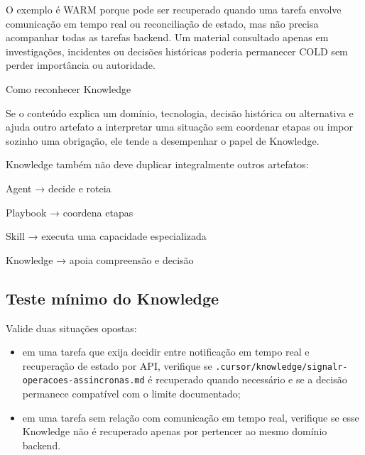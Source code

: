 \documentclass[
  10pt,
  a4paper,
  oneside]{book}
\newenvironment{Shaded}{}{}
\newcommand{\NormalTok}[1]{#1}
\providecommand{\tightlist}{%
  \setlength{\itemsep}{0pt}\setlength{\parskip}{0pt}}
\renewenvironment{Shaded}{\begin{snugshade}}{\end{snugshade}}%
\begin{document}
O exemplo é WARM porque pode ser recuperado quando uma tarefa envolve
comunicação em tempo real ou reconciliação de estado, mas não precisa
acompanhar todas as tarefas backend. Um material consultado apenas em
investigações, incidentes ou decisões históricas poderia permanecer COLD
sem perder importância ou autoridade.

\begin{examplebox}{Como reconhecer Knowledge}

Se o conteúdo explica um domínio, tecnologia, decisão histórica ou
alternativa e ajuda outro artefato a interpretar uma situação sem
coordenar etapas ou impor sozinho uma obrigação, ele tende a desempenhar
o papel de Knowledge.

\end{examplebox}

Knowledge também não deve duplicar integralmente outros artefatos:

\begin{Shaded}
\begin{Highlighting}[]
\NormalTok{Agent}
\NormalTok{→ decide e roteia}

\NormalTok{Playbook}
\NormalTok{→ coordena etapas}

\NormalTok{Skill}
\NormalTok{→ executa uma capacidade especializada}

\NormalTok{Knowledge}
\NormalTok{→ apoia compreensão e decisão}
\end{Highlighting}
\end{Shaded}

\hypertarget{teste-muxednimo-do-knowledge}{%
\subsection{Teste mínimo do
Knowledge}\label{teste-muxednimo-do-knowledge}}

Valide duas situações opostas:

\begin{itemize}
\tightlist
\item
  em uma tarefa que exija decidir entre notificação em tempo real e
  recuperação de estado por API, verifique se
  \texttt{.cursor/knowledge/signalr-operacoes-assincronas.md} é
  recuperado quando necessário e se a decisão permanece compatível com o
  limite documentado;
\item
  em uma tarefa sem relação com comunicação em tempo real, verifique se
  esse Knowledge não é recuperado apenas por pertencer ao mesmo domínio
  backend.
\end{itemize}
\end{document}
